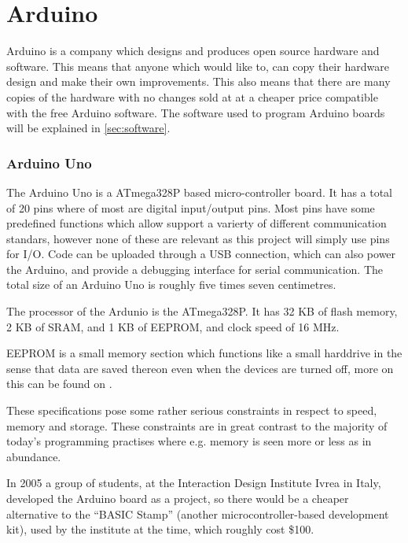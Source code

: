 
\section{Arduino}\label{sec:arduino}
Arduino is a company which designs and produces open source hardware and software.
This means that anyone which would like to, can copy their hardware design and make their own improvements.
This also means that there are many copies of the hardware with no changes sold at at a cheaper price compatible with the free Arduino software.
The software used to program Arduino boards will be explained in \ref{sec:software}.

\subsubsection{Arduino Uno}
The Arduino Uno is a ATmega328P based micro-controller board.
It has a total of 20 pins where of most are digital input/output pins.
Most pins have some predefined functions which allow support a varierty of different communication standars, however none of these are relevant as this project will simply use pins for I/O.
Code can be uploaded through a USB connection, which can also power the Arduino, and provide a debugging interface for serial communication.
The total size of an Arduino Uno is roughly five times seven centimetres. 

The processor of the Ardunio is the ATmega328P.
It has 32 KB of flash memory, 2 KB of SRAM, and 1 KB of EEPROM, and clock speed of 16 MHz.

EEPROM is a small memory section which functions like a small harddrive in the sense that data are saved thereon even when the devices are turned off, more on this can be found on \cite{EEPROM}.

These specifications pose some rather serious constraints in respect to speed, memory and storage.
These constraints are in great contrast to the majority of today's programming practises where e.g. memory is seen more or less as in abundance.

\begin{tcolorbox}[floatplacement=b,float,colback=white!5,colframe=aaublue!50,title=The Birth of the Arduino \cite{birthofarduino}.]
In 2005 a group of students, at the Interaction Design Institute Ivrea in Italy, developed the Arduino board as a project, so there would be a cheaper alternative to the ``BASIC Stamp'' (another microcontroller-based development kit), used by the institute at the time, which roughly cost \$100.
\end{tcolorbox}

